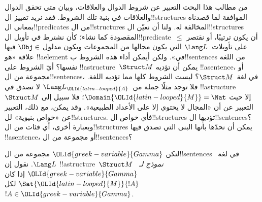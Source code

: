 \documentclass[../../../include/open-logic-section]{subfiles}
\begin{document}


\begin{explain}
من مطالب هذا البحث التعبير عن شروط الدوال والعلاقات، وبيان
متى تحقق الدوال والعلاقات في بنية تلك الشروط. فقد نريد تمييز
ال!!{structure}s الموافقة لما قصدناه بمعاني ال!!{predicate}s
من ال!!{structure}s المخالفة له. ولنا أن نعيّن
ال!!{structure}s المقصودة كما نشاء؛ كأن نشترط في تأويل
ال!!{predicate}~$\le$ أن يكون ترتيبًا، أو نقتصر على تأويلات~$\Lang
L$ التي يكون مجالها من المجموعات ويكون مدلول $\Obj \in$ فيها
علاقة «هو !!a{element} في». ولكن أيمكن أداء هذه الشروط
ب!!{sentence}s من اللغة نفسها؟ أيّ الشروط على
!!a{structure}~$\Struct M$ يمكن أن تؤديه
!!a{sentence}، أو مجموعة من ال!!{sentence}s، في لغة~$\Struct
M$؟ ليست الشروط كلها مما تؤديه اللغة. فلا توجد مثلًا جملة
من~$\Lang L_{\OLId{latin-looped}{A}}$ لا تصدق في !!a{structure}~$\Struct M$ إلا حيث
$\Domain {\OLId{latin-looped}{M}} = \Nat$؛ فلا سبيل إلى التعبير عن أن «المجال لا يحتوي
إلا على الأعداد الطبيعية». وقد يمكن، مع ذلك، التعبير عن «خواص
بنيوية» لل!!{structure}s. فأي خواص ال!!{structure}s تؤديها
ال!!{sentence}s؟ وبعبارة أخرى، أي فئات من ال!!{structure}s
يمكن أن نحدّها بأنها البنى التي تصدق فيها !!a{sentence}، أو
مجموعة من ال!!{sentence}s؟
\end{explain}

\begin{defn}
لتكن ${\OLId{greek-variable}{Gamma}}$ مجموعة من ال!!{sentence}s في لغة~$\Lang L$. نقول إن
!!a{structure}~$\Struct M$ \emph{نموذج لـ}~${\OLId{greek-variable}{Gamma}}$ إذا كان
$\Sat{{\OLId{latin-looped}{M}}}{!A}$ لكل $!A \in {\OLId{greek-variable}{Gamma}}$.
\end{defn}
\end{document}
